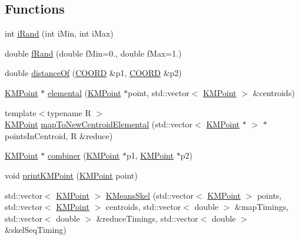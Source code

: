 \subsection*{Functions}
\begin{DoxyCompactItemize}
\item 
int \hyperlink{namespaceKMeans_aeccf7b9a20677968be2392b189462968}{i\-Rand} (int i\-Min, int i\-Max)
\item 
double \hyperlink{namespaceKMeans_aa1cc53313a5e71901410db444f2f1277}{f\-Rand} (double f\-Min=0., double f\-Max=1.)
\item 
double \hyperlink{namespaceKMeans_ab1d0698be0b64e379858f444df37f184}{distance\-Of} (\hyperlink{namespaceKMeans_a32ce08f4c8b30171faaeff5a3a466f30}{C\-O\-O\-R\-D} \&p1, \hyperlink{namespaceKMeans_a32ce08f4c8b30171faaeff5a3a466f30}{C\-O\-O\-R\-D} \&p2)
\item 
\hyperlink{structKMeans_1_1KMPoint}{K\-M\-Point} $\ast$ \hyperlink{namespaceKMeans_a1290694d35842d45c40524d6f1d4cc01}{elemental} (\hyperlink{structKMeans_1_1KMPoint}{K\-M\-Point} $\ast$point, std\-::vector$<$ \hyperlink{structKMeans_1_1KMPoint}{K\-M\-Point} $>$ \&centroids)
\item 
{\footnotesize template$<$typename R $>$ }\\\hyperlink{structKMeans_1_1KMPoint}{K\-M\-Point} \hyperlink{namespaceKMeans_af6ddf3d8fcb489e1b35093fe7387a135}{map\-To\-New\-Centroid\-Elemental} (std\-::vector$<$ \hyperlink{structKMeans_1_1KMPoint}{K\-M\-Point} $\ast$ $>$ $\ast$points\-In\-Centroid, R \&reduce)
\item 
\hyperlink{structKMeans_1_1KMPoint}{K\-M\-Point} $\ast$ \hyperlink{namespaceKMeans_a59f0fc44e94dd722fea19b2c130b7811}{combiner} (\hyperlink{structKMeans_1_1KMPoint}{K\-M\-Point} $\ast$p1, \hyperlink{structKMeans_1_1KMPoint}{K\-M\-Point} $\ast$p2)
\item 
void \hyperlink{namespaceKMeans_a0168f204720c7b64714f53f142004a36}{print\-K\-M\-Point} (\hyperlink{structKMeans_1_1KMPoint}{K\-M\-Point} point)
\item 
std\-::vector$<$ \hyperlink{structKMeans_1_1KMPoint}{K\-M\-Point} $>$ \hyperlink{namespaceKMeans_a2aadc9387de95e9488dd5605465f7cd1}{K\-Means\-Skel} (std\-::vector$<$ \hyperlink{structKMeans_1_1KMPoint}{K\-M\-Point} $>$ points, std\-::vector$<$ \hyperlink{structKMeans_1_1KMPoint}{K\-M\-Point} $>$ centroids, std\-::vector$<$ double $>$ \&map\-Timings, std\-::vector$<$ double $>$ \&reduce\-Timings, std\-::vector$<$ double $>$ \&skel\-Seq\-Timing)
\item 

\end{DoxyCompactItemize}
